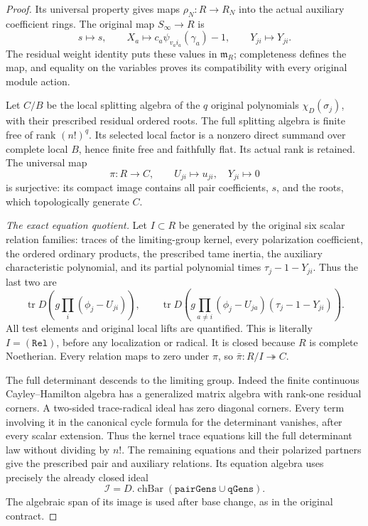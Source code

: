 \begin{proof}
Its universal property gives maps $\rho_N:R\to R_N$ into the actual
auxiliary coefficient rings.  The original map $S_\infty\to R$ is
\[
 s\longmapsto s,\qquad
 X_a\longmapsto c_a\psi_{v_a i_a}(\gamma_a)-1,\qquad
 Y_{ji}\longmapsto Y_{ji}.                                  \tag{MP4}
\]
The residual weight identity puts these values in $\mathfrak m_R$;
completeness defines the map, and equality on the variables proves its
compatibility with every original module action.

Let $C/B$ be the local splitting algebra of the $q$ original
polynomials $\chi_D(\sigma_j)$, with their prescribed residual ordered
roots.  The full splitting algebra is finite free of rank $(n!)^q$.
Its selected local factor is a nonzero direct summand over complete
local $B$, hence finite free and faithfully flat.  Its actual rank is
retained.  The universal map
\[
 \pi:R\longrightarrow C,\qquad U_{ji}\longmapsto u_{ji},
                         \quad Y_{ji}\longmapsto0            \tag{MP5}
\]
is surjective: its compact image contains all pair coefficients, $s$,
and the roots, which topologically generate $C$.

\emph{The exact equation quotient.}
Let $I\subset R$ be generated by the original six scalar relation
families: traces of the limiting-group kernel, every polarization
coefficient, the ordered ordinary products, the prescribed tame
inertia, the auxiliary characteristic polynomial, and its partial
polynomial times $\tau_j-1-Y_{ji}$.  Thus the last two are
\[
 \operatorname{tr}D\!\left(g\prod_i(\phi_j-U_{ji})\right),\qquad
 \operatorname{tr}D\!\left(
 g\prod_{a\ne i}(\phi_j-U_{ja})(\tau_j-1-Y_{ji})\right).
                                                               \tag{MP6}
\]
All test elements and original local lifts are quantified.  This is
literally $I=(\texttt{Rel})$, before any localization or radical.
It is closed because $R$ is complete Noetherian.  Every relation maps
to zero under $\pi$, so $\bar\pi:R/I\twoheadrightarrow C$.

The full determinant descends to the limiting group.  Indeed the finite
continuous Cayley--Hamilton algebra has a generalized matrix algebra
with rank-one residual corners.  A two-sided trace-radical ideal has
zero diagonal corners.  Every term involving it in the canonical
cycle formula for the determinant vanishes, after every scalar
extension.  Thus the kernel trace equations kill the full determinant
law without dividing by $n!$.  The remaining equations and their
polarized partners give the prescribed pair and auxiliary relations.
Its equation algebra uses precisely the already closed ideal
\[
             \mathcal I=D.\operatorname{chBar}
                  (\texttt{pairGens}\cup\texttt{qGens}).     \tag{MP7}
\]
The algebraic span of its image is used after base change, as in the
original contract.


\end{proof}
